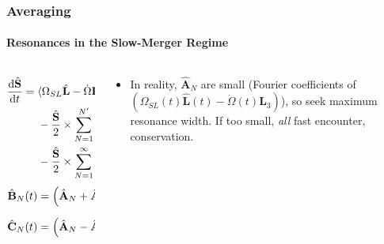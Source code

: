 \documentclass[dvipsnames, 8pt]{beamer}
\newcommand*{\rd}[2]{\frac{\mathrm{d}#1}{\mathrm{d}#2}}
\newcommand*{\bm}[1]{\boldsymbol{\mathbf{#1}}}
\newcommand*{\uv}[1]{\hat{\bm{#1}}}
\newcommand*{\ev}[1]{\langle#1\rangle}
\newcommand*{\p}[1]{\left(#1\right)}
\begin{document}
\begin{frame}
    \frametitle{Averaging}
    \framesubtitle{Resonances in the Slow-Merger Regime}

    \begin{columns}
        \begin{column}{0.5\textwidth}
            \begin{align}
                \rd{\uv{S}}{t} ={}&
                    \ev{\Omega_{SL}\uv{L} - \dot{\Omega} \uv{L_3}}_{LK}
                        \times \uv{S}\nonumber\\
                    &-\frac{\uv{S}}{2} \times \sum\limits_{N = 1}^{N'} \uv{A}_N
                        \cos \p{\frac{2\pi N t}{T_{LK}}}\nonumber\\
                    &- \frac{\uv{S}}{2} \times \sum\limits_{N = 1}^\infty
                        \uv{B}_N \cos\p{\Omega_{\rm eff}t}
                        - \uv{C}_N \sin \p{\Omega_{\rm eff}t},\\
                \uv{B}_N(t) &= \p{\uv{A}_N + \uv{A}_{N + N'}}\cos \p{\frac{\pi
                    \p{N + N'}t}{T_{LK}}},\\
                \uv{C}_N(t) &= \p{\uv{A}_N - \uv{A}_{N + N'}}\sin \p{\frac{\pi
                    \p{N + N'}t}{T_{LK}}}.
            \end{align}
        \end{column}
        \begin{column}{0.5\textwidth}
            \begin{itemize}
                \item In reality, $\uv{A}_N$ are small (Fourier coefficients of
                    $\p{\Omega_{SL}(t)\uv{L}(t) - \dot{\Omega}(t)\uv{L}_3}$), so
                    seek maximum resonance width. If too small, \emph{all} fast
                    encounter, conservation.
            \end{itemize}
        \end{column}
    \end{columns}
\end{frame}
\end{document}
